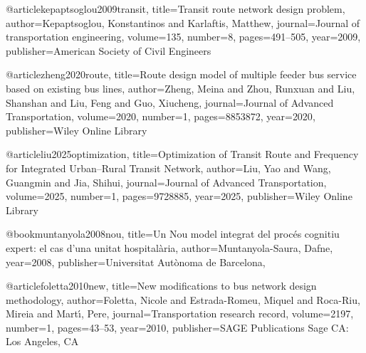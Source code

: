 @article{kepaptsoglou2009transit,
  title={Transit route network design problem},
  author={Kepaptsoglou, Konstantinos and Karlaftis, Matthew},
  journal={Journal of transportation engineering},
  volume={135},
  number={8},
  pages={491--505},
  year={2009},
  publisher={American Society of Civil Engineers}
}

@article{zheng2020route,
  title={Route design model of multiple feeder bus service based on existing bus lines},
  author={Zheng, Meina and Zhou, Runxuan and Liu, Shanshan and Liu, Feng and Guo, Xiucheng},
  journal={Journal of Advanced Transportation},
  volume={2020},
  number={1},
  pages={8853872},
  year={2020},
  publisher={Wiley Online Library}
}

@article{liu2025optimization,
  title={Optimization of Transit Route and Frequency for Integrated Urban--Rural Transit Network},
  author={Liu, Yao and Wang, Guangmin and Jia, Shihui},
  journal={Journal of Advanced Transportation},
  volume={2025},
  number={1},
  pages={9728885},
  year={2025},
  publisher={Wiley Online Library}
}


@book{muntanyola2008nou,
  title={Un Nou model integrat del proc{\'e}s cognitiu expert: el cas d'una unitat hospital{\`a}ria},
  author={Muntanyola-Saura, Dafne},
  year={2008},
  publisher={Universitat Aut{\`o}noma de Barcelona,}
}

@article{foletta2010new,
  title={New modifications to bus network design methodology},
  author={Foletta, Nicole and Estrada-Romeu, Miquel and Roca-Riu, Mireia and Mart{\'\i}, Pere},
  journal={Transportation research record},
  volume={2197},
  number={1},
  pages={43--53},
  year={2010},
  publisher={SAGE Publications Sage CA: Los Angeles, CA}
}

